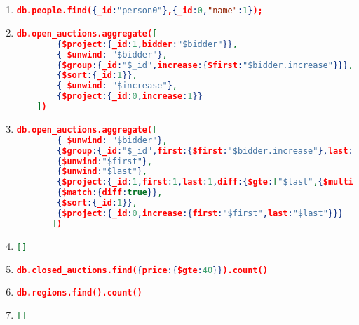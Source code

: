 \label{xmark-queries-mongodb}
\begin{enumerate}[label=Q\arabic*.]
	\item %
	\begin{lstlisting}[language=JSON,   basicstyle=\scriptsize]
		db.people.find({_id:"person0"},{_id:0,"name":1});
	\end{lstlisting}
	
	\item %
	\begin{lstlisting}[language=JSON,  basicstyle=\scriptsize]
	db.open_auctions.aggregate([
		{$project:{_id:1,bidder:"$bidder"}},
		{ $unwind: "$bidder"},
		{$group:{_id:"$_id",increase:{$first:"$bidder.increase"}}},
		{$sort:{_id:1}},
		{ $unwind: "$increase"},
		{$project:{_id:0,increase:1}}
	])
	\end{lstlisting}
	
    \item %
	\begin{lstlisting}[language=JSON,   basicstyle=\scriptsize]
	   db.open_auctions.aggregate([
		{ $unwind: "$bidder"},
		{$group:{_id:"$_id",first:{$first:"$bidder.increase"},last:{$last:"$bidder.increase"}}},
		{$unwind:"$first"},
		{$unwind:"$last"},
		{$project:{_id:1,first:1,last:1,diff:{$gte:["$last",{$multiply:["$first",2]}]}}},
		{$match:{diff:true}},
		{$sort:{_id:1}},
		{$project:{_id:0,increase:{first:"$first",last:"$last"}}}
	   ])
	\end{lstlisting}
	
	
    \item %
	\begin{lstlisting}[language=JSON,   basicstyle=\scriptsize]
	   []
	\end{lstlisting}
	
	
    \item %
	\begin{lstlisting}[language=JSON,   basicstyle=\scriptsize]
	   db.closed_auctions.find({price:{$gte:40}}).count()
	\end{lstlisting}
	
    \item %
	\begin{lstlisting}[language=JSON,   basicstyle=\scriptsize]
	   db.regions.find().count()
	\end{lstlisting}
	
	
    \item %
	\begin{lstlisting}[language=JSON,   basicstyle=\scriptsize]
	   []
	\end{lstlisting}
	

\end{enumerate}
